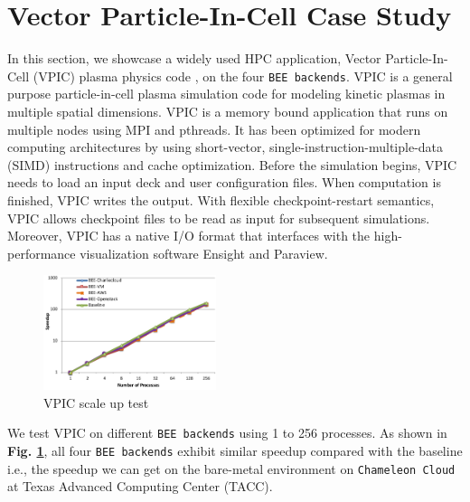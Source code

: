 \section{Vector Particle-In-Cell Case Study}
\label{case-study-section}
 In this section, we showcase a widely used HPC application, Vector Particle-In-Cell (VPIC) plasma physics code \cite{bowers20080, bowers2008ultrahigh, bowers2009advances}, on the four \texttt{BEE backends}. VPIC is a general purpose particle-in-cell plasma simulation code for modeling kinetic plasmas in multiple spatial dimensions. VPIC is a memory bound application that runs on multiple nodes using MPI and pthreads. It has been optimized for modern computing architectures by using short-vector, single-instruction-multiple-data (SIMD) instructions and cache optimization. Before the simulation begins, VPIC needs to load an input deck and user configuration files. When computation is finished, VPIC writes the output. With flexible checkpoint-restart semantics,  VPIC allows checkpoint files to be read as input for subsequent simulations. Moreover, VPIC has a native I/O format that interfaces with the high-performance visualization software Ensight and Paraview. 


\begin{figure}[h]
	\vspace*{-1em}
    \centering
    \includegraphics[width=0.45\textwidth]{figures/vpic-test.pdf}
    \caption{VPIC scale up test}
    \label{vpic-test}
    \vspace*{-1em}
\end{figure}

We test VPIC on different \texttt{BEE backends} using 1 to 256 processes. As shown in \textbf{Fig. \ref{vpic-test}}, all four \texttt{BEE backends} exhibit similar speedup compared with the baseline i.e., the speedup we can get on the bare-metal environment on \texttt{Chameleon Cloud} at Texas Advanced Computing Center (TACC).

